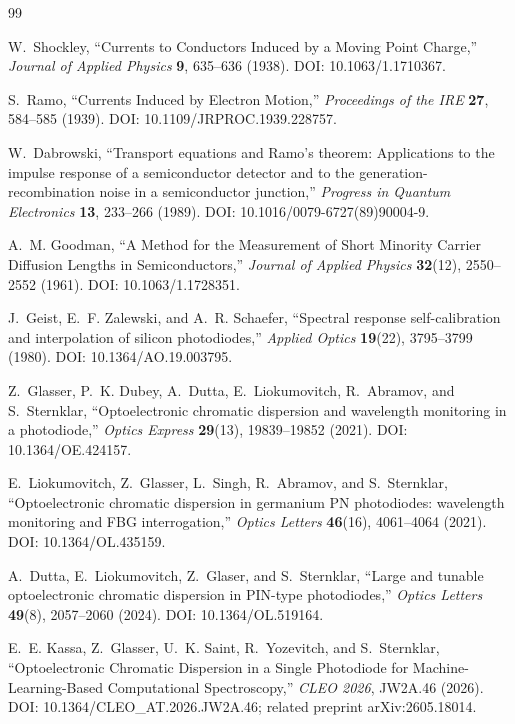 \documentclass[11pt]{article}
\begin{document}
\begin{thebibliography}{99}

W.~Shockley, ``Currents to Conductors Induced by a Moving Point Charge,'' \emph{Journal of Applied Physics} \textbf{9}, 635--636 (1938). DOI: 10.1063/1.1710367.

S.~Ramo, ``Currents Induced by Electron Motion,'' \emph{Proceedings of the IRE} \textbf{27}, 584--585 (1939). DOI: 10.1109/JRPROC.1939.228757.

W.~Dabrowski, ``Transport equations and Ramo's theorem: Applications to the impulse response of a semiconductor detector and to the generation-recombination noise in a semiconductor junction,'' \emph{Progress in Quantum Electronics} \textbf{13}, 233--266 (1989). DOI: 10.1016/0079-6727(89)90004-9.

A.~M. Goodman, ``A Method for the Measurement of Short Minority Carrier Diffusion Lengths in Semiconductors,'' \emph{Journal of Applied Physics} \textbf{32}(12), 2550--2552 (1961). DOI: 10.1063/1.1728351.

J.~Geist, E.~F. Zalewski, and A.~R. Schaefer, ``Spectral response self-calibration and interpolation of silicon photodiodes,'' \emph{Applied Optics} \textbf{19}(22), 3795--3799 (1980). DOI: 10.1364/AO.19.003795.

Z.~Glasser, P.~K. Dubey, A.~Dutta, E.~Liokumovitch, R.~Abramov, and S.~Sternklar, ``Optoelectronic chromatic dispersion and wavelength monitoring in a photodiode,'' \emph{Optics Express} \textbf{29}(13), 19839--19852 (2021). DOI: 10.1364/OE.424157.

E.~Liokumovitch, Z.~Glasser, L.~Singh, R.~Abramov, and S.~Sternklar, ``Optoelectronic chromatic dispersion in germanium PN photodiodes: wavelength monitoring and FBG interrogation,'' \emph{Optics Letters} \textbf{46}(16), 4061--4064 (2021). DOI: 10.1364/OL.435159.

A.~Dutta, E.~Liokumovitch, Z.~Glaser, and S.~Sternklar, ``Large and tunable optoelectronic chromatic dispersion in PIN-type photodiodes,'' \emph{Optics Letters} \textbf{49}(8), 2057--2060 (2024). DOI: 10.1364/OL.519164.

E.~E. Kassa, Z.~Glasser, U.~K. Saint, R.~Yozevitch, and S.~Sternklar, ``Optoelectronic Chromatic Dispersion in a Single Photodiode for Machine-Learning-Based Computational Spectroscopy,'' \emph{CLEO 2026}, JW2A.46 (2026). DOI: 10.1364/CLEO\_AT.2026.JW2A.46; related preprint arXiv:2605.18014.


\end{thebibliography}
\end{document}
